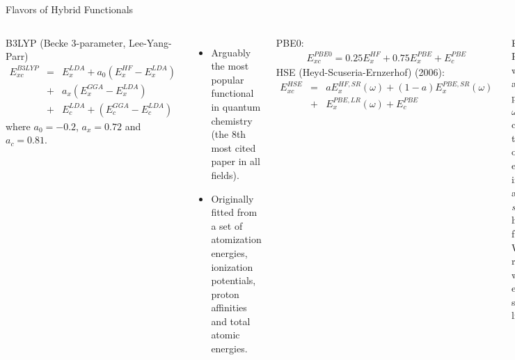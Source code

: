 \documentclass[aspectratio=169]{beamer}
\begin{document}
    \begin{frame}{Flavors of Hybrid Functionals}
        \begin{columns}
            B3LYP (Becke 3-parameter, Lee-Yang-Parr)\cite{beckeDensityFunctionalThermochemistry1993}
            \begin{eqnarray*}
                E^{B3LYP}_{xc} & = & E_x^{LDA} + a_0 (E_x^{HF} - E_x^{LDA})\\
                & + & a_x (E_x^{GGA}-E_x^{LDA}) \\
                & +&  E_c^{LDA} +(E_c^{GGA} - E_c^{LDA})
            \end{eqnarray*}
            where $a_0 = -0.2$, $a_x = 0.72$ and $a_c = 0.81$.
            \begin{itemize}
                \item Arguably the most popular functional in quantum chemistry (the 8th most cited paper in all fields).
                \item Originally fitted from a set of atomization energies, ionization potentials, proton affinities and total atomic energies.
            \end{itemize}

            PBE0:
            \begin{eqnarray*}
                E^{PBE0}_{xc} = 0.25E_x^{HF} + 0.75 E_x^{PBE} + E_c^{PBE}
            \end{eqnarray*}
            HSE (Heyd-Scuseria-Ernzerhof) (2006):\cite{heydHybridFunctionalsBased2003,heydErratumHybridFunctionals2006}
            \begin{eqnarray*}
                E^{HSE}_{xc} & = & a E_x^{HF,SR}(\omega) +  (1-a) E_x^{PBE,SR}(\omega) \\
                &+& E_x^{PBE,LR}(\omega) + E_c^{PBE}
            \end{eqnarray*}

            Effectively PBE0, but with an adjustable parameter $\omega$ ($\sim 0.2$) controlling the range of the exchange interaction, aka a \textit{screened} hybrid functional. Works remarkably well for extended systems like solids.
        \end{columns}


    \end{frame}
\end{document}
